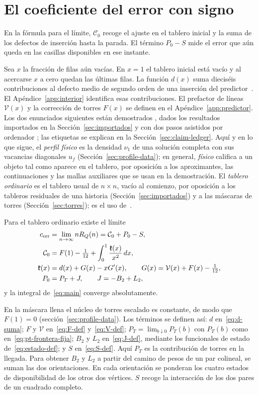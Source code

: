 \section{El coeficiente del error con signo}\label{sec:principal}
En la fórmula para el límite, $\mathcal C_0$ recoge el ajuste en el tablero inicial y la suma de
los defectos de inserción hasta la parada. El término $P_0-S$ mide el error que aún queda en las
casillas disponibles en ese instante.

Sea $x$ la fracción de filas aún vacías. En $x=1$ el tablero inicial está vacío y al acercarse
$x$ a cero quedan las últimas filas. La función $d(x)$ suma dieciséis contribuciones al defecto
medio de segundo orden de una inserción del predictor~\cite{pc}. El
Apéndice~\ref{app:interior} identifica esas contribuciones. El prefactor de líneas
$\mathcal V(x)$ y la corrección de torres $F(x)$ se definen en el Apéndice~\ref{app:predictor}.
Los dos enunciados siguientes están demostrados , dados los resultados importados en la
Sección~\ref{sec:importados} y con dos pasos asistidos por ordenador ; las etiquetas se
explican en la Sección~\ref{sec:claim-ledger}. Aquí y en lo que sigue, el \emph{perfil físico} es la
densidad $\nu_1$ de una solución completa con sus vacancias diagonales $u_f$
(Sección~\ref{sec:profile-data}); en general, \emph{físico} califica a un objeto tal como aparece en el
tablero, por oposición a los aproximantes, las continuaciones y las mallas auxiliares que se usan en la
demostración. El \emph{tablero ordinario} es el tablero usual de $n\times n$, vacío al comienzo, por
oposición a los tableros residuales de una historia (Sección~\ref{sec:importados}) y a las máscaras de
torres (Sección~\ref{sec:torres}); es el uso de~\cite{pc,tc}.

\begin{teorema}\label{teo:principal}
Para el tablero ordinario existe el límite
\begin{align}
 c_{\mathrm{err}}&=\lim_{n\to\infty}nR_Q(n)=\mathcal C_0+P_0-S,\label{eq:main}\\
 \mathcal C_0&=F(1)-\tfrac1{12}+\int_0^1 \frac{\mathfrak{k}(x)}{x^2}\,dx,\notag\\
 \mathfrak{k}(x)&=d(x)+G(x)-xG'(x),\qquad G(x)=\mathcal V(x)+F(x)-\tfrac1{12},\notag\\
 P_0&=P_T+J,\qquad J=-B_2+L_2,\notag
\end{align}
y la integral de~\eqref{eq:main} converge absolutamente.
\end{teorema}
En la máscara llena el núcleo de torres escalado es constante, de modo que \(F(1)=0\)
(sección~\ref{sec:profile-data}). Los términos se definen así: $d$ en~\eqref{eq:d-suma}; $F$ y
$\mathcal V$ en~\eqref{eq:F-def} y~\eqref{eq:V-def}; $P_T=\lim_{b\downarrow0}P_T(b)$ con $P_T(b)$ como
en~\eqref{eq:pt-frontera-fija}; $B_2$ y $L_2$ en~\eqref{eq:J-def}, mediante los funcionales de estado
de~\eqref{eq:estado-def}; y $S$ en~\eqref{eq:S-def}. Aquí $P_T$ es la contribución de torres en la
llegada. Para obtener
 $B_2$ y $L_2$ a partir del
camino de pesos de un par colineal, se suman las dos orientaciones. En cada orientación se
ponderan los cuatro estados de disponibilidad de los otros dos vértices.
$S$ recoge la interacción de los dos pares de un cuadrado completo.

